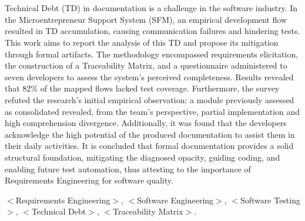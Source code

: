 \section*{} 
\noindent Technical Debt (TD) in documentation is a challenge in the software industry. In the Microentrepreneur Support System (SFM), an empirical development flow resulted in TD accumulation, causing communication failures and hindering tests. This work aims to report the analysis of this TD and propose its mitigation through formal artifacts. The methodology encompassed requirements elicitation, the construction of a Traceability Matrix, and a questionnaire administered to seven developers to assess the system's perceived completeness. Results revealed that 82\% of the mapped flows lacked test coverage. Furthermore, the survey refuted the research's initial empirical observation: a module previously assessed as consolidated revealed, from the team's perspective, partial implementation and high comprehension divergence. Additionally, it was found that the developers acknowledge the high potential of the produced documentation to assist them in their daily activities. It is concluded that formal documentation provides a solid structural foundation, mitigating the diagnosed opacity, guiding coding, and enabling future test automation, thus attesting to the importance of Requirements Engineering for software quality.

 $<$Requirements Engineering$>$, $<$Software Engineering$>$, $<$Software Testing$>$, $<$Technical Debt$>$, $<$Traceability Matrix$>$.